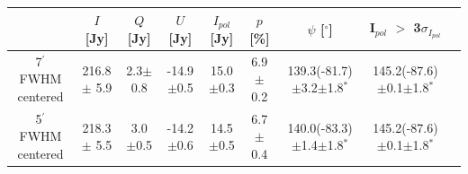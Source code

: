 \documentclass[twocolumn,traditabstract]{aa}
\begin{document}
\begin{table}
  \centering
      \begin{tabular}{ccccccccc}
      \hline
      \hline
       & \small $I$ [Jy] & \small $Q$ [Jy] & \small $U$ [Jy] & \small $I_{pol}$ [Jy] & \small $p$ [\%] & \small $\psi$ [$^\circ$] & \small I$_{pol}$ $>$ 3$\sigma_{I_{pol}}$ \\
      \hline

	\small 7$^{\prime}$ FWHM centered & \small 216.8 $\pm$ 5.9 & \small 2.3$\pm$0.8 & \small -14.9 $\pm$0.5 & \small 15.0 $\pm$0.3 & \small 6.9$\pm$0.2 & \small 139.3(-81.7)$\pm$3.2$\pm$1.8$^*$ & \small 145.2(-87.6)$\pm$0.1$\pm$1.8$^*$\\ 

 
     	      
\small 5$^{\prime}$ FWHM centered & \small 218.3 $\pm$ 5.5  & \small 3.0 $\pm$0.5 & \small -14.2$\pm$0.6 & \small 14.5$\pm$0.5 & \small 6.7$\pm$0.4 & \small 140.0(-83.3)$\pm$1.4$\pm$1.8$^*$ & \small 145.2(-87.6)$\pm$0.1$\pm$1.8$^*$ \\ 


\end{tabular}
\end{table}
\end{document}
